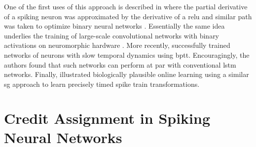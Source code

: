 \documentclass[journal,onecolumn,11pt]{IEEEtran}
\begin{document}
One of the first uses of this approach is described in
\citet{bohte_error-backpropagation_2011} where the partial derivative of a
spiking neuron was approximated by the derivative of a \gls{relu}
and similar path was taken to optimize binary neural networks
\citep{courbariaux_binarized_2016}.
Essentially the same idea underlies the training of large-scale
convolutional networks with binary activations on neuromorphic hardware
\cite{esser_convolutional_2016}.
More recently, \cite{bellec_long_2018} successfully trained networks of 
neurons with slow temporal dynamics using \gls{bptt}. Encouragingly, the 
authors found that such networks can perform at par with conventional 
\gls{lstm} networks.
Finally, \cite{zenke_superspike:_2018} illustrated biologically plausible online
learning using a similar \gls{sg} approach to learn precisely timed spike train
transformations. 

\cite{OConnor_Welling16_deepspik} %








\section{Credit Assignment in Spiking Neural Networks}
\label{sec:credit_assignment}

\end{document}
